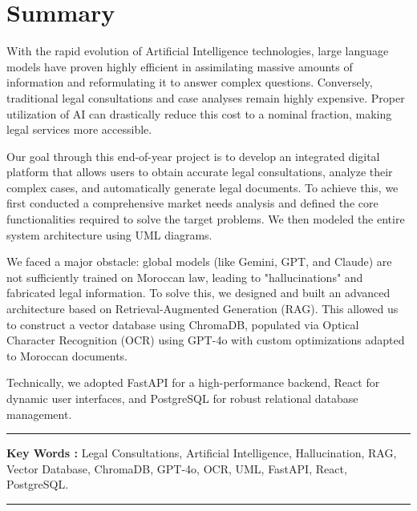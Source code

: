 \chapter*{Summary}

With the rapid evolution of Artificial Intelligence technologies, large language models have proven highly efficient in assimilating massive amounts of information and reformulating it to answer complex questions. Conversely, traditional legal consultations and case analyses remain highly expensive. Proper utilization of AI can drastically reduce this cost to a nominal fraction, making legal services more accessible.

Our goal through this end-of-year project is to develop an integrated digital platform that allows users to obtain accurate legal consultations, analyze their complex cases, and automatically generate legal documents. To achieve this, we first conducted a comprehensive market needs analysis and defined the core functionalities required to solve the target problems. We then modeled the entire system architecture using UML diagrams.

We faced a major obstacle: global models (like Gemini, GPT, and Claude) are not sufficiently trained on Moroccan law, leading to "hallucinations" and fabricated legal information. To solve this, we designed and built an advanced architecture based on Retrieval-Augmented Generation (RAG). This allowed us to construct a vector database using ChromaDB, populated via Optical Character Recognition (OCR) using GPT-4o with custom optimizations adapted to Moroccan documents.

Technically, we adopted FastAPI for a high-performance backend, React for dynamic user interfaces, and PostgreSQL for robust relational database management.

\noindent\rule[2pt]{\textwidth}{0.5pt}

{\textbf{Key Words :}}
Legal Consultations, Artificial Intelligence, Hallucination, RAG, Vector Database, ChromaDB, GPT-4o, OCR, UML, FastAPI, React, PostgreSQL.
\\
\noindent\rule[2pt]{\textwidth}{0.5pt}